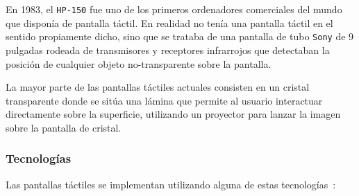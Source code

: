 En 1983, el \texttt{HP-150} fue uno de los primeros ordenadores comerciales del 
mundo que disponía de pantalla táctil. En realidad no tenía una pantalla táctil 
en el sentido propiamente dicho, sino que se trataba de una pantalla de tubo 
\texttt{Sony} de 9 pulgadas rodeada de transmisores y receptores infrarrojos 
que detectaban la posición de cualquier objeto no-transparente sobre la 
pantalla.

La mayor parte de las pantallas táctiles actuales consisten en un cristal 
transparente donde se sitúa una lámina que permite al usuario interactuar 
directamente sobre la superficie, utilizando un proyector para lanzar la 
imagen sobre la pantalla de cristal.

  \subsubsection{Tecnologías}

Las pantallas táctiles se implementan utilizando alguna de estas
tecnologías~\cite{bib:touchscreen}:

